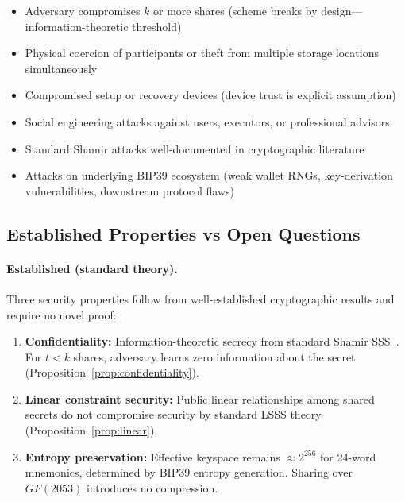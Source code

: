 \documentclass[11pt]{article}
\begin{document}
\begin{itemize}[noitemsep]
    \item Adversary compromises $k$ or more shares (scheme breaks by design—information-theoretic threshold)
    \item Physical coercion of participants or theft from multiple storage locations simultaneously
    \item Compromised setup or recovery devices (device trust is explicit assumption)
    \item Social engineering attacks against users, executors, or professional advisors
    \item Standard Shamir attacks well-documented in cryptographic literature~\cite{shamir1979,stinson2006}
    \item Attacks on underlying BIP39 ecosystem (weak wallet RNGs, key-derivation vulnerabilities, downstream protocol flaws)
\end{itemize}

\subsection{Established Properties vs Open Questions}
\label{sec:standard-vs-open}

\paragraph{Established (standard theory).} Three security properties follow from well-established cryptographic results and require no novel proof:

\begin{enumerate}[noitemsep]
    \item \textbf{Confidentiality:} Information-theoretic secrecy from standard Shamir SSS~\cite{shamir1979}. For $t < k$ shares, adversary learns zero information about the secret (Proposition~\ref{prop:confidentiality}).
    
    \item \textbf{Linear constraint security:} Public linear relationships among shared secrets do not compromise security by standard LSSS theory~\cite{beimel2011,cramer2000} (Proposition~\ref{prop:linear}).
    
    \item \textbf{Entropy preservation:} Effective keyspace remains $\approx 2^{256}$ for 24-word mnemonics, determined by BIP39 entropy generation. Sharing over $GF(2053)$ introduces no compression.
\end{enumerate}
\end{document}
